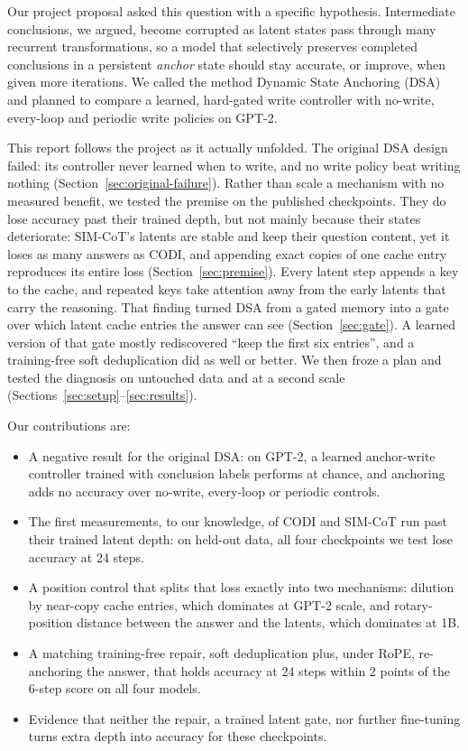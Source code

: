 \documentclass[11pt]{article}
\begin{document}
Our project proposal asked this question with a specific hypothesis. Intermediate conclusions, we argued, become corrupted as
latent states pass through many recurrent transformations, so a model that selectively preserves completed conclusions in a
persistent \emph{anchor} state should stay accurate, or improve, when given more iterations. We called the method Dynamic
State Anchoring (DSA) and planned to compare a learned, hard-gated write controller with no-write, every-loop and periodic
write policies on GPT-2.

This report follows the project as it actually unfolded. The original DSA design failed: its controller never learned when
to write, and no write policy beat writing nothing (Section~\ref{sec:original-failure}). Rather than scale a mechanism with
no measured benefit, we tested the premise on the published checkpoints. They do lose accuracy past their trained depth,
but not mainly because their states deteriorate: SIM-CoT's latents are stable and keep their question content, yet it loses
as many answers as CODI, and appending exact copies of one cache entry reproduces its entire loss
(Section~\ref{sec:premise}). Every latent step appends a key to the cache, and repeated keys take attention away from the
early latents that carry the reasoning. That finding turned DSA from a gated memory into a gate over which latent cache
entries the answer can see (Section~\ref{sec:gate}). A learned version of that gate mostly rediscovered ``keep the first six
entries'', and a training-free soft deduplication did as well or better. We then froze a plan and tested the diagnosis on
untouched data and at a second scale (Sections~\ref{sec:setup}--\ref{sec:results}).

Our contributions are:
\begin{itemize}
  \item A negative result for the original DSA: on GPT-2, a learned anchor-write controller trained with conclusion labels
    performs at chance, and anchoring adds no accuracy over no-write, every-loop or periodic controls.
  \item The first measurements, to our knowledge, of CODI and SIM-CoT run past their trained latent depth: on held-out data,
    all four checkpoints we test lose accuracy at 24 steps.
  \item A position control that splits that loss exactly into two mechanisms: dilution by near-copy cache entries, which
    dominates at GPT-2 scale, and rotary-position distance between the answer and the latents, which dominates at 1B.
  \item A matching training-free repair, soft deduplication plus, under RoPE, re-anchoring the answer, that holds accuracy at
    24 steps within 2 points of the 6-step score on all four models.
  \item Evidence that neither the repair, a trained latent gate, nor further fine-tuning turns extra depth into accuracy for
    these checkpoints.
\end{itemize}
\end{document}
